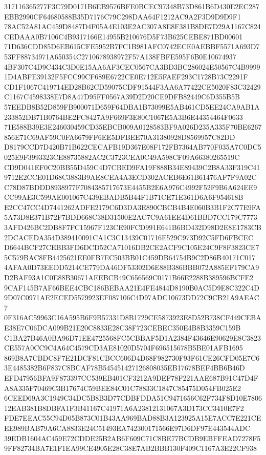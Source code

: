 \documentclass[UTF8,fontset=fandol,zihao=-4,a4paper]{ctexart}
\begin{document}
{{317116365277F3C79D0171B6EB9576BFE0BCEC97348B73D861B6D430E2EC287EBB2990CF64680588B35D7176C79C298DAA64F1212AC9A2F3D9D9D9F1
78AC52A81AC459D8487D4F05A4E103E2AC307A8E8F381B8DE7D29A1167C824CEDAAA0B7106C4B9317166E14955B210676D5F73B625CEBE871BD00601
71D636CDD85D6EB615CFE5952B7FC1B981AFC0742ECE0AEBBF5571A693D753FF88734971A650354C2710678938972F57A138FBFE595F6B0E10674937
4BF307C4D9C434C3D0E15AA6AF3CEC0567CA3BD3BC286024E50567C4B99991D4ABFE39132F5FCC99CF689E6722CE0E712E5FAEF293C1728B73C2291F
CD1F1067C419714ED28B62CD59075CDF91544F3AA6A77422CE5020F83C32429C1167C4598338E7D8A47D95FF0567A39D2D20CE9DFB82449C6D355B5B
57EEDB8B52D859FB900071D659F64DBA1B73099E5AB461CD5EE24CA9AB1A233852DB71B0764BE2FC8427A9F669F3E80C1067E5A3B6E44354464F0633
71E588B39E3E246030459CD35EBCB009A0128583BF9A026D235A335F70BE6267856E71C69AF59C0FA6679FF6EE5DFBEE70A31380928D8569957C82DD
D8179CCD7D420B71B622CECAFB19D367E08F172FB7364AB770F035A7C0DC5025E9F3993323CE88735882AC2C3723CEA0C49A598CF09A66380265519C
CD9D041EF0C20BB55D459C4D7CBED9FA19F888B34E89439C2B8A33F319C419712E2CCE01D68C3883B9AE8CEA4A3ECD302ACEB6E61B61476AF7F9A02C
C78D87BDDD8938977F7084385717673E4455B2E6A976C4992F52F9B6A624EE9CC99AE3C599AE001067C439EBADB5B44F1B71CE71E361D6A6F954618B
E2CC47CC4D7441262ADFE2179C6D3DA3E890CBCB4B4E060B3B1F2C77E9FA5A73D8E371B72F7BDD668C38D31500E2AC7C9A61EE4D61BBD7CC179C7773
3AFD426BC2DB8F7FC15967F123CE90FCD991E641B6BD432D98D2E8E1783CB2DCACEDA354D389410091CA1C3C13439C01716E529C973D92C5FD6FBCEC
D6644BCF27CEBB3FD6DCD52CA71016DB2CE2ACF9C105E24C9F8F3823CE75C579BAC8FB4425621EE0FB7EC503BB01C459DB64754B9C2D86B40171C017
4AFAA0D73EEDD5214CE779DA46DF53302D6E88B386BBB072A885EF179CA9D2BAF93A1C0E88B30671AEEBCB49C656569C0171B66E2288B389596BCFE2
9CAF145B7AF66BEE4CBC186BEBAA21E4FE4844D8190B0AC5D9E8C322C4D9D07C0971AE2ECED5579923EF087106C4D97ADC10673DD72C9CB21A9AEAC7
0F316AC59963C16A595B6F9B57331D8B1729CE5873923E8D52B738CF449CEBAE38E7C06DCA099B21E20C8833E28C38F723CEBEC350E4B8B3359C159B
C1BA27B46A0BA96D71EE4725568FC5CBBAF5D1A2384F43646E90629E8C3823CE557A0CC9C4A64C4579CD3AE81020D5704F696515678B5BE01AFB1695
869B8A7CBDC8F7E21DCF81CBCC606D4D68F982730F93F61CE26CFD05E7C63E4485382B6F837C8BCAF78B545451427126808035EB17678BEF4BB6B46D
EFD47956BFA9F873397CC539EB401CF3212A9DEF78F221AAE687B91C47D4FA8A335F70469C3B17674C59BEE84C01C78833C1847C85475D054FB025E2
6CEED69A3C1949C34DC5B8B3D77CDBFDDA51C9471656C62F734F8D10E780612EAB381B8DBFA1F3B41167C41971A6A23812131067A3D173CC3410E7F2
FDE7EEAC55C94D05B873C01B43AA969BAD88B3A123925A15E7ACC7E221CEEE989BAB79A6CA8833E24C51493EA742300171566E97D6DF97E443544ADC
39EDB1604AC459E72CDDE25B2AB6F609C71C8BE77BCDB9EBFFEAD7278F59FF82734BA7E1F1EA99CE4905E28C38E7AB2BBB130F409C1167A3E22CF938
}}
\end{document}
